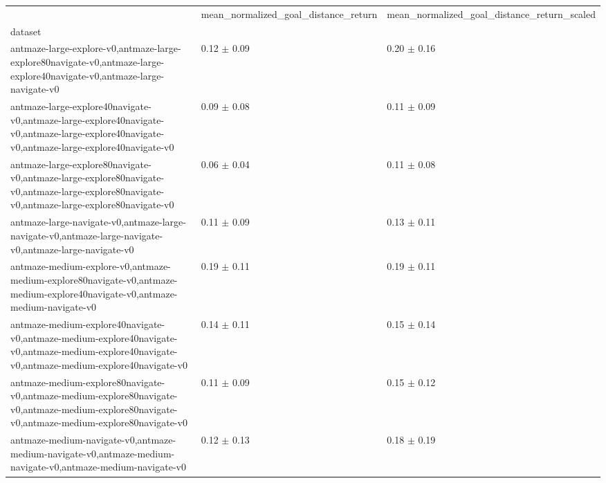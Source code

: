 \begin{tabular}{lll}
\toprule
 & mean_normalized_goal_distance_return & mean_normalized_goal_distance_return_scaled \\
dataset &  &  \\
\midrule
antmaze-large-explore-v0,antmaze-large-explore80navigate-v0,antmaze-large-explore40navigate-v0,antmaze-large-navigate-v0 & 0.12 $\pm$ 0.09 & 0.20 $\pm$ 0.16 \\
antmaze-large-explore40navigate-v0,antmaze-large-explore40navigate-v0,antmaze-large-explore40navigate-v0,antmaze-large-explore40navigate-v0 & 0.09 $\pm$ 0.08 & 0.11 $\pm$ 0.09 \\
antmaze-large-explore80navigate-v0,antmaze-large-explore80navigate-v0,antmaze-large-explore80navigate-v0,antmaze-large-explore80navigate-v0 & 0.06 $\pm$ 0.04 & 0.11 $\pm$ 0.08 \\
antmaze-large-navigate-v0,antmaze-large-navigate-v0,antmaze-large-navigate-v0,antmaze-large-navigate-v0 & 0.11 $\pm$ 0.09 & 0.13 $\pm$ 0.11 \\
antmaze-medium-explore-v0,antmaze-medium-explore80navigate-v0,antmaze-medium-explore40navigate-v0,antmaze-medium-navigate-v0 & 0.19 $\pm$ 0.11 & 0.19 $\pm$ 0.11 \\
antmaze-medium-explore40navigate-v0,antmaze-medium-explore40navigate-v0,antmaze-medium-explore40navigate-v0,antmaze-medium-explore40navigate-v0 & 0.14 $\pm$ 0.11 & 0.15 $\pm$ 0.14 \\
antmaze-medium-explore80navigate-v0,antmaze-medium-explore80navigate-v0,antmaze-medium-explore80navigate-v0,antmaze-medium-explore80navigate-v0 & 0.11 $\pm$ 0.09 & 0.15 $\pm$ 0.12 \\
antmaze-medium-navigate-v0,antmaze-medium-navigate-v0,antmaze-medium-navigate-v0,antmaze-medium-navigate-v0 & 0.12 $\pm$ 0.13 & 0.18 $\pm$ 0.19 \\
\bottomrule
\end{tabular}
